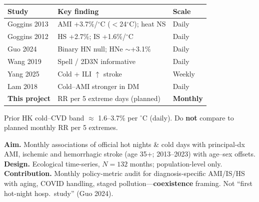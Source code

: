 \documentclass[11pt]{article}
\begin{document}
\begin{minipage}[t]{0.327\textwidth}
\begin{tcolorbox}[enhanced,colback=Panel,colframe=Teal!60,boxrule=0.8pt,arc=0pt,left=2.5mm,right=2.5mm,top=2.5mm,bottom=2.5mm,width=\linewidth,height=778mm,valign=top,before skip=0pt,after skip=0pt]
\begin{tcolorbox}
{\fontsize{8.7}{10.3}\selectfont\renewcommand{\arraystretch}{1.08}
\begin{tabularx}{\linewidth}{@{}>{\RaggedRight}p{2.15cm}>{\RaggedRight}X>{\centering\arraybackslash}p{1.4cm}@{}}
\toprule
\textbf{Study} & \textbf{Key finding} & \textbf{Scale} \\
\midrule
Goggins 2013 & AMI +3.7\%/$^\circ$C ($<$24$^\circ$C); heat NS & Daily \\
Goggins 2012 & HS +2.7\%; IS +1.6\%/$^\circ$C & Daily \\
Guo 2024 & Binary HN null; HNe $\sim$+3.1\% & Daily \\
Wang 2019 & Spell / 2D3N informative & Daily \\
Yang 2025 & Cold + ILI $\uparrow$ stroke & Weekly \\
Lam 2018 & Cold--AMI stronger in DM & Daily \\
\textbf{This project} & RR per 5 extreme days (planned) & \textbf{Monthly} \\
\bottomrule
\end{tabularx}}
\vspace{0.8mm}
{\color{Warn}\fontsize{8.3}{10}\selectfont
Prior HK cold--CVD band $\approx$ 1.6--3.7\% per $^\circ$C (daily). Do \textbf{not} compare to planned monthly RR per 5 extremes.\par}

\end{tcolorbox}

\begin{tcolorbox}[enhanced,colback=Panel,colframe=Teal,boxrule=0.85pt,arc=1.2pt,left=6pt,right=6pt,top=4pt,bottom=4pt,coltitle=white,fonttitle=\bfseries\fontsize{12.5}{14}\selectfont,attach boxed title to top left={yshift=-1.5mm,xshift=3.5mm},boxed title style={colback=Teal,colframe=Teal,arc=1pt,boxrule=0pt,left=4.5pt,right=4.5pt,top=1pt,bottom=1pt},title={4. Aim, design \& contribution},before skip=0pt,after skip=1.5mm,width=\linewidth]
\RaggedRight\fontsize{9.8}{11.6}\selectfont

\textbf{Aim.} Monthly associations of official hot nights \& cold days with
principal-dx AMI, ischemic and hemorrhagic stroke (age 35+; 2013--2023) with age--sex offsets.\\[0.4mm]
\textbf{Design.} Ecological time-series, $N=132$ months; population-level only.\\[0.4mm]
\textbf{Contribution.} Monthly policy-metric audit for diagnosis-specific AMI/IS/HS with aging,
COVID handling, staged pollution---\textbf{coexistence} framing. Not ``first hot-night hosp.\ study'' (Guo 2024).


\end{tcolorbox}
\end{tcolorbox}
\end{minipage}
\end{document}

